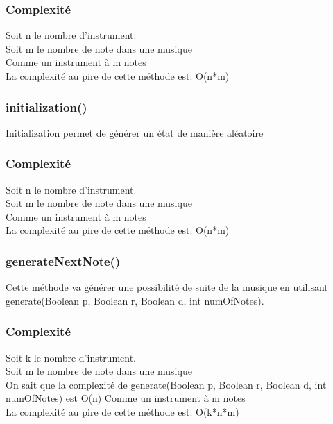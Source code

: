 \documentclass[12pt, a4paper]{article}
\begin{document}
                \subsubsection*{Complexité}
                        Soit n le nombre d'instrument.\\
                        Soit m le nombre de note dans une musique\\
                        Comme un instrument à m notes\\
                        La complexité au pire de cette méthode est: O(n*m)
            
            
            \subsubsection{initialization()}
                Initialization permet de générer un état de manière aléatoire\\
                \subsubsection*{Complexité}
                    Soit n le nombre d'instrument.\\
                    Soit m le nombre de note dans une musique\\
                    Comme un instrument à m notes\\
                    La complexité au pire de cette méthode est: O(n*m)
                
            
            \subsubsection{generateNextNote()}
                Cette méthode va générer une possibilité de suite de la musique en utilisant generate(Boolean p, Boolean r, Boolean d, int numOfNotes).\\
                \subsubsection*{Complexité}
                    Soit k le nombre d'instrument.\\
                    Soit m le nombre de note dans une musique\\
                    On sait que la complexité de generate(Boolean p, Boolean r, Boolean d, int numOfNotes) est O(n)
                    Comme un instrument à m notes\\
                    La complexité au pire de cette méthode est: O(k*n*m)
                    
\end{document}
